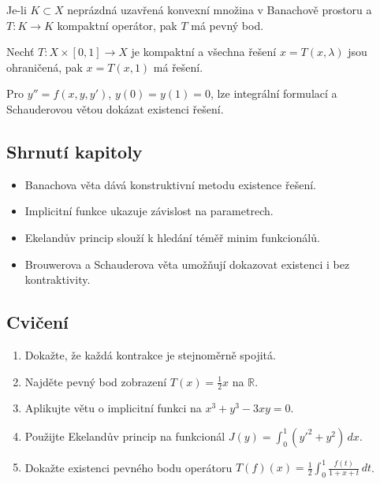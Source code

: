 \begin{theorem}
\label{vet:schauder}
Je-li $K\subset X$ neprázdná uzavřená konvexní množina v Banachově prostoru a $T:K\to K$ kompaktní operátor, pak $T$ má pevný bod.
\end{theorem}

\begin{theorem}
\label{vet:leray-schauder}
Nechť $T:X\times[0,1]\to X$ je kompaktní a všechna řešení $x=T(x,\lambda)$ jsou ohraničená, pak $x=T(x,1)$ má řešení.
\end{theorem}

\begin{example}
\label{ex:schauder-dre}
Pro $y''=f(x,y,y')$, $y(0)=y(1)=0$, lze integrální formulací a Schauderovou větou dokázat existenci řešení.
\end{example}

\spc

\subsection*{Shrnutí kapitoly}
\begin{itemize}
\item Banachova věta dává konstruktivní metodu existence řešení.
\item Implicitní funkce ukazuje závislost na parametrech.
\item Ekelandův princip slouží k hledání téměř minim funkcionálů.
\item Brouwerova a Schauderova věta umožňují dokazovat existenci i bez kontraktivity.
\end{itemize}

\subsection*{Cvičení}
\begin{enumerate}
\item Dokažte, že každá kontrakce je stejnoměrně spojitá.
\item Najděte pevný bod zobrazení $T(x)=\tfrac{1}{2}x$ na $\mathbb{R}$.
\item Aplikujte větu o implicitní funkci na $x^3+y^3-3xy=0$.
\item Použijte Ekelandův princip na funkcionál $J(y)=\int_0^1(y'^2+y^2)\,dx$.
\item Dokažte existenci pevného bodu operátoru $T(f)(x)=\tfrac12\int_0^1 \tfrac{f(t)}{1+x+t}\,dt$.
\end{enumerate}
